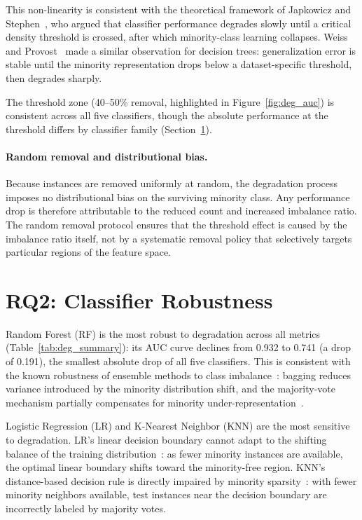 This non-linearity is consistent with the theoretical framework of Japkowicz and Stephen~\cite{japkowicz2002class}, who argued that classifier performance degrades slowly until a critical density threshold is crossed, after which minority-class learning collapses.
Weiss and Provost~\cite{weiss2003effect} made a similar observation for decision trees: generalization error is stable until the minority representation drops below a dataset-specific threshold, then degrades sharply.

The threshold zone (40--50\% removal, highlighted in Figure~\ref{fig:deg_auc}) is consistent across all five classifiers, though the absolute performance at the threshold differs by classifier family (Section~\ref{sec:deg:rq2}).

\paragraph{Random removal and distributional bias.}
Because instances are removed uniformly at random, the degradation process imposes no distributional bias on the surviving minority class.
Any performance drop is therefore attributable to the reduced count and increased imbalance ratio.
The random removal protocol ensures that the threshold effect is caused by the imbalance ratio itself, not by a systematic removal policy that selectively targets particular regions of the feature space.


\section{RQ2: Classifier Robustness}
\label{sec:deg:rq2}

Random Forest (RF) is the most robust to degradation across all metrics (Table~\ref{tab:deg_summary}): its AUC curve declines from 0.932 to 0.741 (a drop of 0.191), the smallest absolute drop of all five classifiers.
This is consistent with the known robustness of ensemble methods to class imbalance~\cite{breiman2001random, galar2012review}: bagging reduces variance introduced by the minority distribution shift, and the majority-vote mechanism partially compensates for minority under-representation~\cite{galar2012review}.

Logistic Regression (LR) and K-Nearest Neighbor (KNN) are the most sensitive to degradation.
LR's linear decision boundary cannot adapt to the shifting balance of the training distribution~\cite{fernandez2018learning}: as fewer minority instances are available, the optimal linear boundary shifts toward the minority-free region.
KNN's distance-based decision rule is directly impaired by minority sparsity~\cite{cover1967nearest, kubat1997addressing}: with fewer minority neighbors available, test instances near the decision boundary are incorrectly labeled by majority votes.

